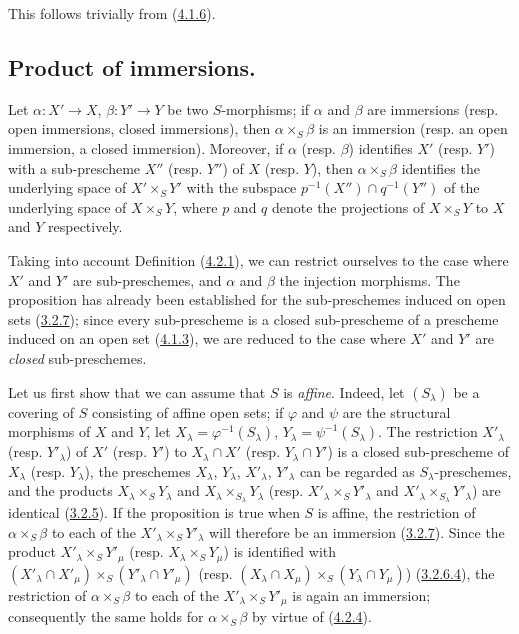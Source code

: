 This follows trivially from (\hyperref[I.4.1.6]{4.1.6}).

\subsection{Product of immersions.}
\label{subsection:I.4.3}

\begin{proposition}[4.3.1]
\label{I.4.3.1}
Let $\alpha:X'\to X$, $\beta:Y'\to Y$ be two $S$-morphisms; if $\alpha$ and
$\beta$ are immersions (resp. open immersions, closed
immersions), then $\alpha\times_S\beta$ is an immersion (resp. an open
immersion, a closed immersion). Moreover, if $\alpha$ (resp. $\beta$)
identifies $X'$ (resp. $Y'$) with a sub-prescheme $X''$ (resp. $Y''$) of $X$
(resp. $Y$), then $\alpha\times_S\beta$ identifies the underlying space of
$X'\times_S Y'$ with the subspace $p^{-1}(X'')\cap q^{-1}(Y'')$ of the
underlying space of $X\times_S Y$, where $p$ and $q$ denote the projections of
$X\times_S Y$ to $X$ and $Y$ respectively.
\end{proposition}

Taking into account Definition (\hyperref[I.4.2.1]{4.2.1}), we can restrict
ourselves to the case where $X'$ and $Y'$ are sub-preschemes, and $\alpha$ and
$\beta$ the injection morphisms. The proposition has already been established
for the sub-preschemes induced on open sets (\hyperref[I.3.2.7]{3.2.7});
since every sub-prescheme is a closed sub-prescheme of a prescheme induced on an
open set (\hyperref[I.4.1.3]{4.1.3}), we are reduced to the case where $X'$
and $Y'$ are \emph{closed} sub-preschemes.

Let us first show that we can assume that $S$ is \emph{affine}. Indeed, let
$(S_\lambda)$ be a covering of $S$ consisting of affine open sets; if
$\varphi$ and $\psi$ are the structural morphisms of $X$ and $Y$, let
$X_\lambda=\varphi^{-1}(S_\lambda)$, $Y_\lambda=\psi^{-1}(S_\lambda)$. The
restriction $X'_\lambda$ (resp. $Y'_\lambda$) of $X'$ (resp. $Y'$) to
$X_\lambda\cap X'$ (resp. $Y_\lambda\cap Y'$) is a closed sub-prescheme of
$X_\lambda$ (resp. $Y_\lambda$), the preschemes $X_\lambda$, $Y_\lambda$,
$X'_\lambda$, $Y'_\lambda$ can be regarded as
$S_\lambda$-preschemes, and the products $X_\lambda\times_S Y_\lambda$ and
$X_\lambda\times_{S_\lambda}Y_\lambda$ (resp.
$X'_\lambda\times_S Y'_\lambda$ and
$X'_\lambda\times_{S_\lambda}Y'_\lambda$) are identical
(\hyperref[I.3.2.5]{3.2.5}). If the proposition is true when $S$ is
affine, the restriction of $\alpha\times_S\beta$ to each of the
$X'_\lambda\times_S Y'_\lambda$ will therefore be an immersion
(\hyperref[I.3.2.7]{3.2.7}). Since the product
$X'_\lambda\times_S Y'_\mu$ (resp. $X_\lambda\times_S Y_\mu$) is identified
with $(X'_\lambda\cap X'_\mu)\times_S(Y'_\lambda\cap Y'_\mu)$ (resp.
$(X_\lambda\cap X_\mu)\times_S(Y_\lambda\cap Y_\mu)$)
(\hyperref[I.3.2.6.4]{3.2.6.4}), the restriction of
$\alpha\times_S\beta$
to each of the $X'_\lambda\times_S Y'_\mu$ is again an immersion; consequently
the same holds for $\alpha\times_S\beta$ by virtue of
(\hyperref[I.4.2.4]{4.2.4}).

